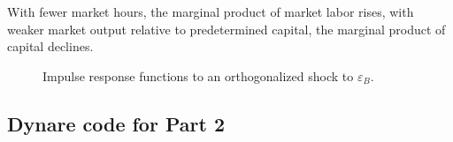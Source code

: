 \documentclass[a4paper,12pt]{article} %
\theoremstyle{nonitalic}
\begin{document}
With fewer market hours, the marginal product of market labor rises,
with weaker market output relative to predetermined capital, the marginal product of capital declines.

\begin{figure}[H]
  \centering
  \hfill
  \caption{Impulse response functions to an orthogonalized shock to $\varepsilon_B$.}
  \label{Fig:IRF:epsB}
\end{figure}

\subsection*{Dynare code for Part 2}


\end{document}
